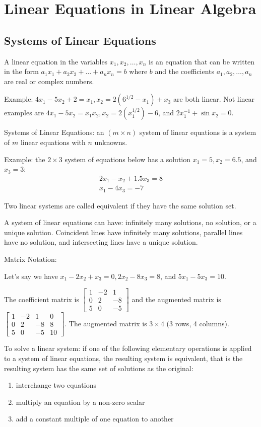 \documentclass[../linalg.tex]{subfiles}
\begin{document}
\chapter{Linear Equations in Linear Algebra}
\section{Systems of Linear Equations}
A linear equation in the variables $x_1,x_2,\dots,x_n$ is an equation that can be written in the form $a_1x_1+a_2x_2+\dots+a_nx_n=b$ where $b$ 
and the coefficients $a_1,a_2,\dots,a_n$ are real or complex numbers.

Example: $4x_1-5x_2+2=x_1, x_2=2(6^{1/2}-x_1)+x_3$ are both linear. Not linear examples are $4x_1-5x_2=x_1x_2, x_2=2(x_1^{1/2})-6$, and $2x_1^{-1}+\sin x_2 = 0$.

Systems of Linear Equations: an $(m\times n)$ system of linear equations is a system of $m$ linear equations with $n$ unknowns.

Example: the $2\times 3$ system of equations below has a solution $x_1=5, x_2=6.5$, and $x_3=3$:
\begin{align*}
    2x_1-x_2+1.5x_3=8\\
    x_1-4x_3=-7
\end{align*}

Two linear systems are called equivalent if they have the same solution set.

A system of linear equations can have: infinitely many solutions, no solution, or a unique solution. Coincident lines have infinitely many solutions, parallel lines have no solution, and intersecting lines have a unique solution.

Matrix Notation:

Let's say we have $x_1-2x_2+x_3=0, 2x_2-8x_3=8$, and $5x_1-5x_3=10$.

The coefficient matrix is 
$\begin{bmatrix}
1 & -2 & 1 \\
0 & 2 & -8 \\
5 & 0 & -5
\end{bmatrix}$ and the augmented matrix is $\begin{bmatrix}
    1 & -2 & 1 & 0 \\
    0 & 2 & -8 & 8\\
    5 & 0 & -5 & 10
\end{bmatrix}$. The augmented matrix is $3\times 4$ (3 rows, 4 columns).

To solve a linear system: if one of the following elementary operations is applied to a system of linear equations, the resulting system is equivalent, 
that is the resulting system has the same set of solutions as the original:
\begin{enumerate}
    \item interchange two equations 
    \item multiply an equation by a non-zero scalar 
    \item add a constant multiple of one equation to another 
\end{enumerate}
\end{document}
